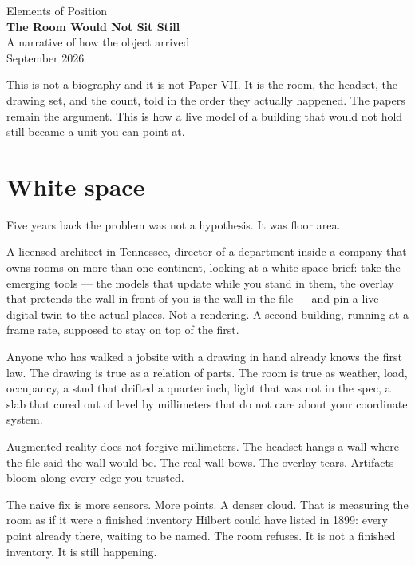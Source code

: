 \documentclass[11pt,a4paper]{article}
\begin{document}
\begin{center}
\vspace*{1.6em}
{\large Elements of Position}\\[1.3em]
{\LARGE\bfseries The Room Would Not Sit Still}\\[0.9em]
{\normalsize A narrative of how the object arrived}\\[1.6em]
{\small September 2026}
\end{center}

\vspace{1.4em}

\noindent
This is not a biography and it is not Paper VII.
It is the room, the headset, the drawing set, and the count, told in the order they actually happened.
The papers remain the argument.
This is how a live model of a building that would not hold still became a unit you can point at.

\vspace{1.2em}

\section{White space}

Five years back the problem was not a hypothesis.
It was floor area.

A licensed architect in Tennessee, director of a department inside a company that owns rooms on more than one continent, looking at a white-space brief: take the emerging tools --- the models that update while you stand in them, the overlay that pretends the wall in front of you is the wall in the file --- and pin a live digital twin to the actual places.
Not a rendering.
A second building, running at a frame rate, supposed to stay on top of the first.

Anyone who has walked a jobsite with a drawing in hand already knows the first law.
The drawing is true as a relation of parts.
The room is true as weather, load, occupancy, a stud that drifted a quarter inch, light that was not in the spec, a slab that cured out of level by millimeters that do not care about your coordinate system.

Augmented reality does not forgive millimeters.
The headset hangs a wall where the file said the wall would be.
The real wall bows.
The overlay tears.
Artifacts bloom along every edge you trusted.

The naive fix is more sensors.
More points.
A denser cloud.
That is measuring the room as if it were a finished inventory Hilbert could have listed in 1899: every point already there, waiting to be named.
The room refuses.
It is not a finished inventory.
It is still happening.
\end{document}
